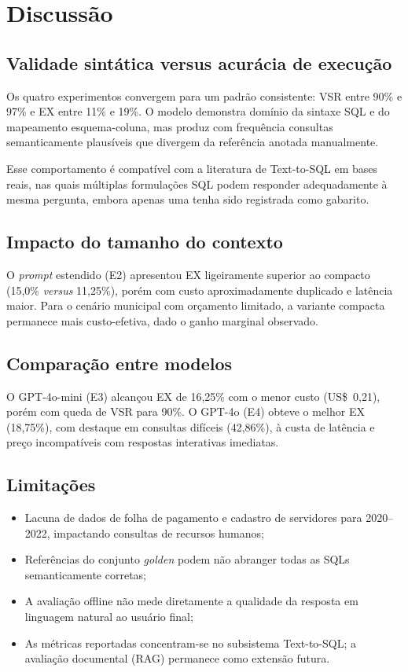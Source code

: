 \chapter{Discussão}

\section{Validade sintática versus acurácia de execução}

Os quatro experimentos convergem para um padrão consistente: VSR entre 90\% e 97\% e EX entre 11\% e 19\%. O modelo demonstra domínio da sintaxe SQL e do mapeamento esquema-coluna, mas produz com frequência consultas semanticamente plausíveis que divergem da referência anotada manualmente.

Esse comportamento é compatível com a literatura de Text-to-SQL em bases reais, nas quais múltiplas formulações SQL podem responder adequadamente à mesma pergunta, embora apenas uma tenha sido registrada como gabarito.

\section{Impacto do tamanho do contexto}

O \textit{prompt} estendido (E2) apresentou EX ligeiramente superior ao compacto (15,0\% \textit{versus} 11,25\%), porém com custo aproximadamente duplicado e latência maior. Para o cenário municipal com orçamento limitado, a variante compacta permanece mais custo-efetiva, dado o ganho marginal observado.

\section{Comparação entre modelos}

O GPT-4o-mini (E3) alcançou EX de 16,25\% com o menor custo (US\$~0,21), porém com queda de VSR para 90\%. O GPT-4o (E4) obteve o melhor EX (18,75\%), com destaque em consultas difíceis (42,86\%), à custa de latência e preço incompatíveis com respostas interativas imediatas.

\section{Limitações}

\begin{itemize}
    \item Lacuna de dados de folha de pagamento e cadastro de servidores para 2020--2022, impactando consultas de recursos humanos;
    \item Referências do conjunto \textit{golden} podem não abranger todas as SQLs semanticamente corretas;
    \item A avaliação offline não mede diretamente a qualidade da resposta em linguagem natural ao usuário final;
    \item As métricas reportadas concentram-se no subsistema Text-to-SQL; a avaliação documental (RAG) permanece como extensão futura.
\end{itemize}

